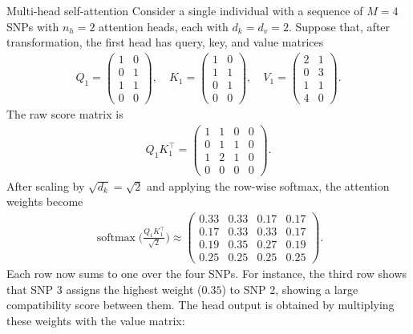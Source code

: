\begin{exmp}{Multi-head self-attention}
Consider a single individual with a sequence of $M = 4$ SNPs with $n_h = 2$ attention heads, each with $d_k = d_v = 2$. Suppose that, after transformation, the first head has query, key, and value matrices
\begin{align*}
    Q_1 = \begin{pmatrix} 1 & 0 \\ 0 & 1 \\ 1 & 1 \\ 0 & 0 \end{pmatrix}, \quad
    K_1 = \begin{pmatrix} 1 & 0 \\ 1 & 1 \\ 0 & 1 \\ 0 & 0 \end{pmatrix}, \quad
    V_1 = \begin{pmatrix} 2 & 1 \\ 0 & 3 \\ 1 & 1 \\ 4 & 0 \end{pmatrix}.
\end{align*}
The raw score matrix is
\begin{align*}
    Q_1 K_1^\top = \begin{pmatrix} 1 & 1 & 0 & 0 \\ 0 & 1 & 1 & 0 \\ 1 & 2 & 1 & 0 \\ 0 & 0 & 0 & 0 \end{pmatrix}.
\end{align*}
After scaling by $\sqrt{d_k} = \sqrt{2}$ and applying the row-wise softmax, the attention weights become
\begin{align*}
    \operatorname{softmax}\!\biggl(\frac{Q_1 K_1^\top}{\sqrt{2}}\biggr)
    \approx \begin{pmatrix} 0.33 & 0.33 & 0.17 & 0.17 \\ 0.17 & 0.33 & 0.33 & 0.17 \\ 0.19 & 0.35 & 0.27 & 0.19 \\ 0.25 & 0.25 & 0.25 & 0.25 \end{pmatrix}.
\end{align*}
Each row now sums to one over the four SNPs. For instance, the third row shows that SNP 3 assigns the highest weight ($0.35$) to SNP 2, showing a large compatibility score between them. The head output is obtained by multiplying these weights with the value matrix:
\begin{align*}

\end{align*}
\end{exmp}
